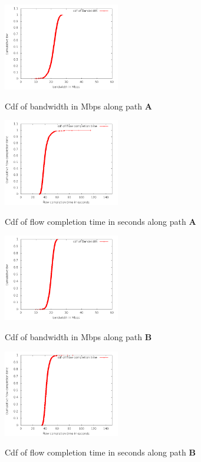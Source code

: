 \documentclass{sig-alternate-10pt} \usepackage{enumerate}
\begin{document}
{\begin{figure}
\begin{center}
\includegraphics[width=2in]{figures/T2T/bandwidth_cdfplot.png}
    \caption{Cdf of bandwidth in Mbps along path \bf{A} }
    \label{fig:tunnelbw} 
    \includegraphics[width=2in]{figures/T2T/flowtime_cdfplot.png}
    \caption{Cdf of flow completion time in seconds along path \bf{A} }
    \label{fig:tunnelft}


\end{center} 
\end{figure}

\begin{figure} 
  \begin{center}
\includegraphics[width=2in]{figures/N2N/bandwidth_cdfplot.png}
    \caption{Cdf of bandwidth in Mbps along path \bf{B} }
    \label{fig:nodebw} 
    \includegraphics[width=2in]{figures/N2N/flowtime_cdfplot.png}
    \caption{Cdf of flow completion time in seconds along path \bf{B} }
    \label{fig:nodeft} 
  \end{center} 
\end{figure}


}
\end{document}
